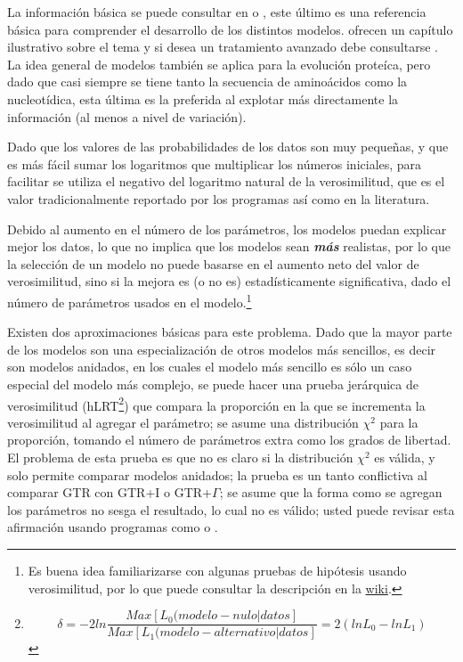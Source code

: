 La informaci\'on b\'asica se puede consultar en \cite{Felsenstein2004} 
o \cite{Swofford1996}, este \'ultimo es una referencia b\'asica para comprender el desarrollo de los distintos modelos. \cite{PageHolmes1998} ofrecen un cap\'itulo ilustrativo sobre el tema y si desea un tratamiento avanzado debe consultarse \cite{yang2006}. La idea general de modelos tambi\'en se aplica para la evoluci\'on prote\'ica, pero dado que casi siempre se tiene tanto la secuencia de amino\'acidos como la nucleot\'idica, esta \'ultima es la preferida al explotar m\'as directamente la informaci\'on (al menos a nivel de variaci\'on).

Dado que los valores de las probabilidades de los datos son muy peque\~nas, y que es m\'as f\'acil sumar los logaritmos que multiplicar los n\'umeros iniciales, para facilitar se utiliza el negativo del logaritmo natural de la verosimilitud, que es el valor tradicionalmente reportado por los programas as\'i como en la literatura.

Debido al aumento en el n\'umero de los par\'ametros, los modelos puedan explicar mejor los datos, lo que no implica que los modelos sean \emph{\textbf{m\'as}} realistas, por lo que la selecci\'on de un modelo no puede basarse en el aumento neto del valor de verosimilitud, sino si la mejora es (o no es) estad\'isticamente significativa, dado el n\'umero de par\'ametros usados en el modelo.\footnote{Es buena idea familiarizarse con algunas pruebas de hip\'otesis usando verosimilitud, por lo que puede consultar la descripci\'on en la \href{http://en.wikipedia.org/wiki/Neyman\%E2\%80\%93Pearson\_lemma}{wiki}.}

Existen dos aproximaciones b\'asicas para este problema. Dado que la mayor parte de los modelos son una especializaci\'on de otros modelos m\'as sencillos, es decir son modelos anidados, en los cuales el modelo m\'as sencillo es s\'olo un caso especial del modelo m\'as complejo, se puede hacer una prueba jer\'arquica de verosimilitud (hLRT\footnote
{\begin{equation}
\delta = -2 ln \frac{Max[L_{0}(modelo-nulo|datos]}{Max[L_{1}(modelo-alternativo|datos]} = 2 (ln L_{0} - ln L_{1}) 
\end{equation}
}) que compara la proporci\'on en la que se incrementa la verosimilitud al agregar el par\'ametro; se asume una distribuci\'on $\chi^2$  para la proporci\'on, tomando el n\'umero de par\'ametros extra como los grados de libertad. El problema de esta prueba es que no es claro si la distribuci\'on $\chi^2$ es v\'alida, y solo permite comparar modelos anidados; la prueba es un tanto conflictiva al comparar GTR con GTR+I o GTR+$\Gamma$; se asume que la forma como se agregan los par\'ametros no sesga el resultado, lo cual no es v\'alido; usted puede revisar esta afirmaci\'on usando programas como  o .

